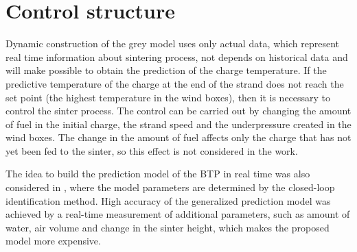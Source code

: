 \documentclass[AMS,STIX2COL]{WileyNJD-v2}
\begin{document}
\section{Control structure} \label{ControlStruct}
Dynamic construction of the grey model uses only actual data, which represent real time information about sintering process, not depends on historical data and will make possible to obtain the prediction of the charge temperature. If the predictive temperature of the charge at the end of the strand does not reach the set point (the highest temperature in the wind boxes), then it is necessary to control the sinter process. The control can be carried out by changing the amount of fuel in the initial charge, the strand speed and the underpressure created in the wind boxes. The change in the amount of fuel affects only the charge that has not yet been fed to the sinter, so this effect is not considered in the work.

The idea to build the prediction model of the BTP in real time was also considered in \cite{Wu2012a}, where the model parameters are determined by the closed-loop identification method. High accuracy of the generalized prediction model \cite{Wu2012a} was achieved by a real-time measurement of additional parameters, such as amount of water, air volume and change in the sinter height, which makes the proposed model more expensive.
\end{document}
